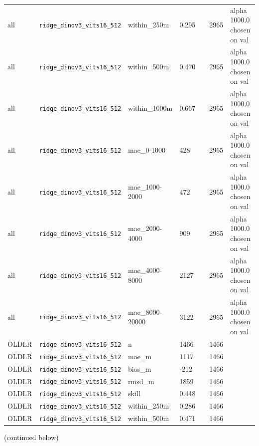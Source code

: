 \begin{center}
{\begin{tabular}{lp{2.4cm}llllp{7.3cm}}
all & \texttt{ridge\_\allowbreak{}dinov3\_\allowbreak{}vits16\_\allowbreak{}512} & within\_250m & 0.295 &  & 2965 & alpha 1000.0 chosen on val \\
all & \texttt{ridge\_\allowbreak{}dinov3\_\allowbreak{}vits16\_\allowbreak{}512} & within\_500m & 0.470 &  & 2965 & alpha 1000.0 chosen on val \\
all & \texttt{ridge\_\allowbreak{}dinov3\_\allowbreak{}vits16\_\allowbreak{}512} & within\_1000m & 0.667 &  & 2965 & alpha 1000.0 chosen on val \\
all & \texttt{ridge\_\allowbreak{}dinov3\_\allowbreak{}vits16\_\allowbreak{}512} & mae\_0-1000 & 428 &  & 2965 & alpha 1000.0 chosen on val \\
all & \texttt{ridge\_\allowbreak{}dinov3\_\allowbreak{}vits16\_\allowbreak{}512} & mae\_1000-2000 & 472 &  & 2965 & alpha 1000.0 chosen on val \\
all & \texttt{ridge\_\allowbreak{}dinov3\_\allowbreak{}vits16\_\allowbreak{}512} & mae\_2000-4000 & 909 &  & 2965 & alpha 1000.0 chosen on val \\
all & \texttt{ridge\_\allowbreak{}dinov3\_\allowbreak{}vits16\_\allowbreak{}512} & mae\_4000-8000 & 2127 &  & 2965 & alpha 1000.0 chosen on val \\
all & \texttt{ridge\_\allowbreak{}dinov3\_\allowbreak{}vits16\_\allowbreak{}512} & mae\_8000-20000 & 3122 &  & 2965 & alpha 1000.0 chosen on val \\
OLDLR & \texttt{ridge\_\allowbreak{}dinov3\_\allowbreak{}vits16\_\allowbreak{}512} & n & 1466 &  & 1466 &  \\
OLDLR & \texttt{ridge\_\allowbreak{}dinov3\_\allowbreak{}vits16\_\allowbreak{}512} & mae\_m & 1117 &  & 1466 &  \\
OLDLR & \texttt{ridge\_\allowbreak{}dinov3\_\allowbreak{}vits16\_\allowbreak{}512} & bias\_m & -212 &  & 1466 &  \\
OLDLR & \texttt{ridge\_\allowbreak{}dinov3\_\allowbreak{}vits16\_\allowbreak{}512} & rmsd\_m & 1859 &  & 1466 &  \\
OLDLR & \texttt{ridge\_\allowbreak{}dinov3\_\allowbreak{}vits16\_\allowbreak{}512} & skill & 0.448 &  & 1466 &  \\
OLDLR & \texttt{ridge\_\allowbreak{}dinov3\_\allowbreak{}vits16\_\allowbreak{}512} & within\_250m & 0.286 &  & 1466 &  \\
OLDLR & \texttt{ridge\_\allowbreak{}dinov3\_\allowbreak{}vits16\_\allowbreak{}512} & within\_500m & 0.471 &  & 1466 &  \\
\bottomrule
\end{tabular}}\par\footnotesize(continued below)
\end{center}

